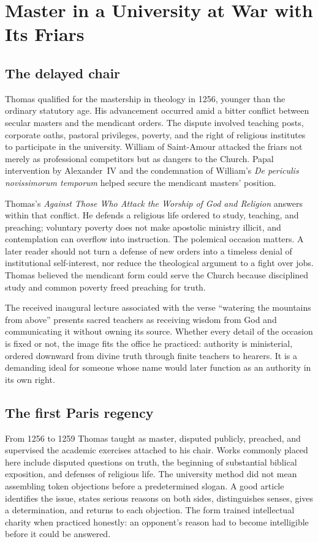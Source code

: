 \section{Master in a University at War with Its Friars}

\subsection{The delayed chair}

Thomas qualified for the mastership in theology in 1256, younger than the
ordinary statutory age.  His advancement occurred amid a bitter conflict
between secular masters and the mendicant orders.  The dispute involved
teaching posts, corporate oaths, pastoral privileges, poverty, and the right of
religious institutes to participate in the university.  William of Saint-Amour
attacked the friars not merely as professional competitors but as dangers to
the Church.  Papal intervention by Alexander~IV and the condemnation of
William's \emph{De periculis novissimorum temporum} helped secure the mendicant
masters' position.

Thomas's \emph{Against Those Who Attack the Worship of God and Religion}
answers within that conflict.  He defends a religious life ordered to study,
teaching, and preaching; voluntary poverty does not make apostolic ministry
illicit, and contemplation can overflow into instruction.  The polemical
occasion matters.  A later reader should not turn a defense of new orders into
a timeless denial of institutional self-interest, nor reduce the theological
argument to a fight over jobs.  Thomas believed the mendicant form could serve
the Church because disciplined study and common poverty freed preaching for
truth.

The received inaugural lecture associated with the verse ``watering the
mountains from above'' presents sacred teachers as receiving wisdom from God
and communicating it without owning its source.  Whether every detail of the
occasion is fixed or not, the image fits the office he practiced: authority is
ministerial, ordered downward from divine truth through finite teachers to
hearers.  It is a demanding ideal for someone whose name would later function
as an authority in its own right.

\subsection{The first Paris regency}

From 1256 to 1259 Thomas taught as master, disputed publicly, preached, and
supervised the academic exercises attached to his chair.  Works commonly
placed here include disputed questions on truth, the beginning of substantial
biblical exposition, and defenses of religious life.  The university method
did not mean assembling token objections before a predetermined slogan.  A
good article identifies the issue, states serious reasons on both sides,
distinguishes senses, gives a determination, and returns to each objection.
The form trained intellectual charity when practiced honestly: an opponent's
reason had to become intelligible before it could be answered.

